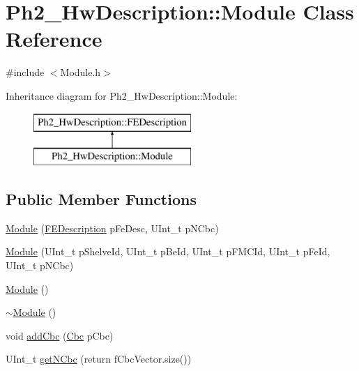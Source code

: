 \hypertarget{class_ph2___hw_description_1_1_module}{\section{Ph2\-\_\-\-Hw\-Description\-:\-:Module Class Reference}
\label{class_ph2___hw_description_1_1_module}
}


{\ttfamily \#include $<$Module.\-h$>$}

Inheritance diagram for Ph2\-\_\-\-Hw\-Description\-:\-:Module\-:\begin{figure}[H]
\begin{center}
\leavevmode
\includegraphics[height=2.000000cm]{class_ph2___hw_description_1_1_module}
\end{center}
\end{figure}
\subsection*{Public Member Functions}
\begin{DoxyCompactItemize}
\item 
\hyperlink{class_ph2___hw_description_1_1_module_a10d038fa907fc27d6abc64f3113f5f41}{Module} (\hyperlink{class_ph2___hw_description_1_1_f_e_description}{F\-E\-Description} p\-Fe\-Desc, U\-Int\-\_\-t p\-N\-Cbc)
\item 
\hyperlink{class_ph2___hw_description_1_1_module_af3ee523f9a74d621e62c537f771d9282}{Module} (U\-Int\-\_\-t p\-Shelve\-Id, U\-Int\-\_\-t p\-Be\-Id, U\-Int\-\_\-t p\-F\-M\-C\-Id, U\-Int\-\_\-t p\-Fe\-Id, U\-Int\-\_\-t p\-N\-Cbc)
\item 
\hyperlink{class_ph2___hw_description_1_1_module_aaec7dd439bdf7a1db3f2136569a00125}{Module} ()
\item 
\hyperlink{class_ph2___hw_description_1_1_module_a8142f34ea2308ed78e8d0dbb042bc5f3}{$\sim$\-Module} ()
\item 
void \hyperlink{class_ph2___hw_description_1_1_module_ab164db2f0397dba150fa17a7639dccd0}{add\-Cbc} (\hyperlink{class_ph2___hw_description_1_1_cbc}{Cbc} p\-Cbc)
\item 
U\-Int\-\_\-t \hyperlink{class_ph2___hw_description_1_1_module_afe1f549d4f03578c9f7aa901b4065d47}{get\-N\-Cbc} (return f\-Cbc\-Vector.\-size())
\end{DoxyCompactItemize}
